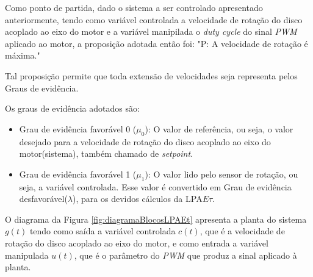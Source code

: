 Como ponto de partida, 
dado o sistema a ser controlado apresentado anteriormente, 
tendo como variável controlada 
a velocidade de rotação do disco acoplado ao eixo do motor e 
a variável manipilada o \emph{duty cycle} do sinal \emph{PWM} aplicado ao motor,
a proposição adotada então foi: 
"P: A velocidade de rotação é máxima."

Tal proposição permite que toda extensão de velocidades 
seja representa pelos Graus de evidência.

Os graus de evidência adotados são: 

\begin{itemize}
\item Grau de evidência favorável 0 ($\mu_0$): 
O valor de referência, ou seja, 
o valor desejado para a velocidade de rotação do 
disco acoplado ao eixo do motor(sistema),
também chamado de \emph{setpoint}.
\item Grau de evidência favorável 1 ($\mu_1$): 
O valor lido pelo sensor de rotação, ou seja, a variável controlada.
Esse valor é convertido em 
Grau de evidência desfavorável($\lambda$),
para os devidos cálculos da LPA$E\tau$.
\end{itemize}

O diagrama da Figura \ref{fig:diagramaBlocosLPAEt} apresenta 
a planta do sistema $g(t)$ tendo como saída a 
variável controlada $c(t)$, 
que é a velocidade de rotação do disco 
acoplado ao eixo do motor, 
e como entrada a variável manipulada $u(t)$, 
que é o parâmetro do \emph{PWM} 
que produz a sinal aplicado à planta.



